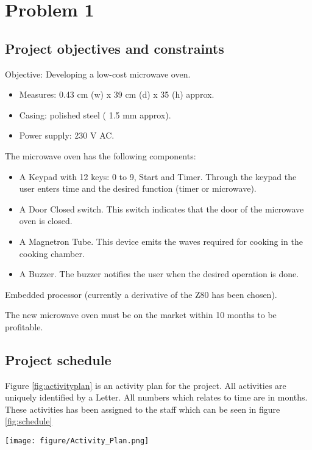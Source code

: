 \chapter{Problem 1}
\label{chp:intro}

\section{Project objectives and constraints}

Objective: Developing a low-cost microwave oven. 

\begin{itemize}
	\setlength\itemsep{0.1em}
	\item Measures: 0.43 cm (w) x 39 cm (d) x 35 (h) approx.
	\item Casing: polished steel ( 1.5 mm approx).
	\item Power supply: 230 V AC.
\end{itemize}

The microwave oven has the following components:

\begin{itemize}
	\setlength\itemsep{0.1em}
	\item A Keypad with 12 keys: 0 to 9, Start and Timer. Through the keypad the user enters
	time and the desired function (timer or microwave).

	\item A Door Closed switch. This switch indicates that the door of the microwave oven is
	closed.

	\item A Magnetron Tube. This device emits the waves required for cooking in the cooking
	chamber.
	
	\item A Buzzer. The buzzer notifies the user when the desired operation is done.
\end{itemize}

Embedded processor (currently a derivative of the Z80 has been chosen).

The new microwave oven must be on the market within 10 months to be profitable.

\section{Project schedule}
Figure \ref{fig:activityplan} is an activity plan for the project. All activities are uniquely identified by a Letter. All numbers which relates to time are in months. These activities has been assigned to the staff which can be seen in figure \ref{fig:schedule} 
\begin{sidewaysfigure}
	\centering 
	\texttt{[image: figure/Activity\_Plan.png]} 
	\caption{Activity Plan} 
	\label{fig:activityplan}
\end{sidewaysfigure}
